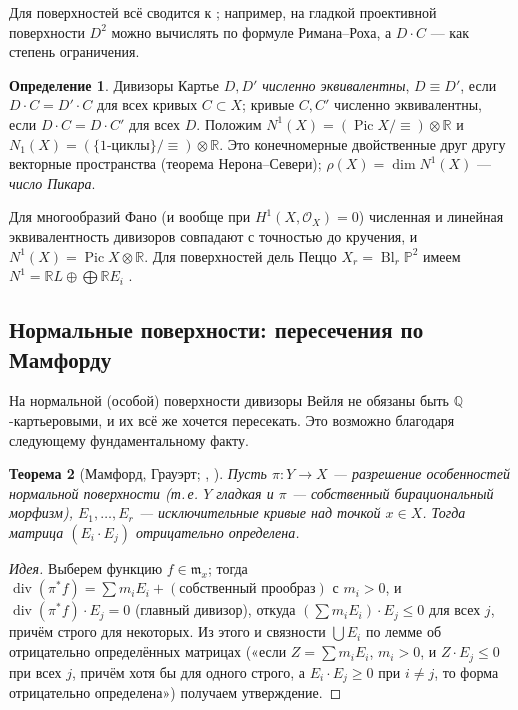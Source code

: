 \documentclass[11pt,a4paper]{article}
\theoremstyle{plain}
\newtheorem{theorem}{Теорема}[section]
\theoremstyle{definition}
\newtheorem{definition}[theorem]{Определение}
\theoremstyle{remark}
\newcommand{\Q}{\mathbb{Q}}
\newcommand{\R}{\mathbb{R}}
\newcommand{\PP}{\mathbb{P}}
\newcommand{\cO}{\mathcal{O}}
\newcommand{\mm}{\mathfrak{m}}
\DeclareMathOperator{\Pic}{Pic}
\DeclareMathOperator{\divv}{div}
\DeclareMathOperator{\Bl}{Bl}
\begin{document}
Для поверхностей всё сводится к \cite[\S\,0.10]{AG}; например, на гладкой проективной поверхности
$D^2$ можно вычислять по формуле Римана--Роха, а $D\cdot C$ --- как степень ограничения.

\begin{definition}
Дивизоры Картье $D,D'$ \emph{численно эквивалентны}, $D\equiv D'$, если $D\cdot C=D'\cdot C$ для
всех кривых $C\subset X$; кривые $C,C'$ численно эквивалентны, если $D\cdot C=D\cdot C'$ для всех
$D$. Положим $N^1(X)=(\Pic X/{\equiv})\otimes\R$ и $N_1(X)=(\{\text{1-циклы}\}/{\equiv})\otimes\R$.
Это конечномерные двойственные друг другу векторные пространства (теорема Нерона--Севери);
$\rho(X)=\dim N^1(X)$ --- \emph{число Пикара}.
\end{definition}

Для многообразий Фано (и вообще при $H^1(X,\cO_X)=0$) численная и линейная эквивалентность
дивизоров совпадают с точностью до кручения, и $N^1(X)=\Pic X\otimes\R$. Для поверхностей дель Пеццо
$X_r=\Bl_r\PP^2$ имеем $N^1=\R L\oplus\bigoplus\R E_i$ \cite[следствие~7.7]{AG}.

\subsection{Нормальные поверхности: пересечения по Мамфорду}\label{ss:mumford}

На нормальной (особой) поверхности дивизоры Вейля не обязаны быть $\Q$-картьеровыми, и их всё же
хочется пересекать. Это возможно благодаря следующему фундаментальному факту.

\begin{theorem}[{Мамфорд, Грауэрт; \cite[1.1]{Mum61}, \cite[4.1]{KM}}]\label{thm:negdef}
Пусть $\pi\colon Y\to X$ --- разрешение особенностей нормальной поверхности (т.\,е. $Y$ гладкая
и $\pi$ --- собственный бирациональный морфизм), $E_1,\dots,E_r$ --- исключительные кривые над
точкой $x\in X$. Тогда матрица $(E_i\cdot E_j)$ отрицательно определена.
\end{theorem}

\begin{proof}[Идея]
Выберем функцию $f\in\mm_x$; тогда $\divv(\pi^*f)=\sum m_iE_i+(\text{собственный прообраз})$ с
$m_i>0$, и $\divv(\pi^*f)\cdot E_j=0$ (главный дивизор), откуда $(\sum m_iE_i)\cdot E_j\le0$ для
всех $j$, причём строго для некоторых. Из этого и связности $\bigcup E_i$ по лемме об отрицательно
определённых матрицах («если $Z=\sum m_iE_i$, $m_i>0$, и $Z\cdot E_j\le0$ при всех $j$, причём
хотя бы для одного строго, а $E_i\cdot E_j\ge0$ при $i\ne j$, то форма отрицательно определена»)
получаем утверждение.
\end{proof}
\end{document}

